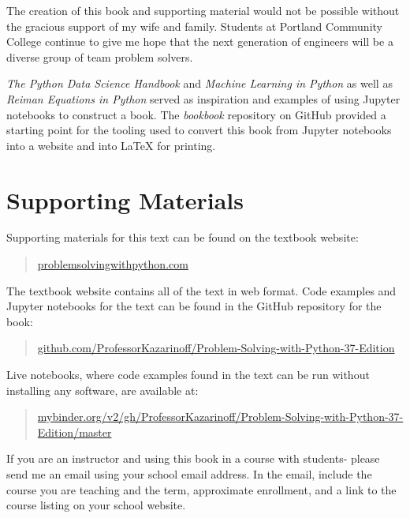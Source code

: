 \documentclass{book}
\begin{document}
    
        The creation of this book and supporting material would not be possible
without the gracious support of my wife and family. Students at Portland
Community College continue to give me hope that the next generation of
engineers will be a diverse group of team problem solvers.

\emph{The Python Data Science Handbook} and \emph{Machine Learning in
Python} as well as \emph{Reiman Equations in Python} served as
inspiration and examples of using Jupyter notebooks to construct a book.
The \emph{bookbook} repository on GitHub provided a starting point for
the tooling used to convert this book from Jupyter notebooks into a
website and into LaTeX for printing.
    




    
        \hypertarget{supporting-materials}{%
\section{Supporting Materials}\label{supporting-materials}}
    




    
        Supporting materials for this text can be found on the textbook website:

\begin{quote}
\href{https://problemsolvingwithpython.com}{problemsolvingwithpython.com}
\end{quote}

The textbook website contains all of the text in web format. Code
examples and Jupyter notebooks for the text can be found in the GitHub
repository for the book:

\begin{quote}
\href{https://github.com/ProfessorKazarinoff/Problem-Solving-with-Python-37-Edition}{github.com/ProfessorKazarinoff/Problem-Solving-with-Python-37-Edition}
\end{quote}

Live notebooks, where code examples found in the text can be run without
installing any software, are available at:

\begin{quote}
\href{https://mybinder.org/v2/gh/ProfessorKazarinoff/Problem-Solving-with-Python-37-Edition/master}{mybinder.org/v2/gh/ProfessorKazarinoff/Problem-Solving-with-Python-37-Edition/master}
\end{quote}

If you are an instructor and using this book in a course with students-
please send me an email using your school email address. In the email,
include the course you are teaching and the term, approximate
enrollment, and a link to the course listing on your school website.
\end{document}
